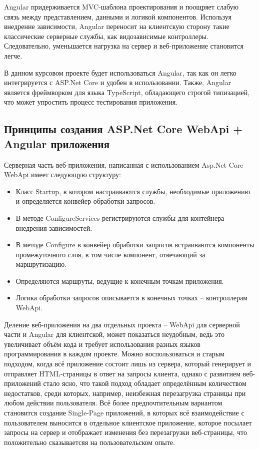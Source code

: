 Angular придерживается MVC-шаблона проектирования и поощряет слабую связь между представлением, данными и логикой компонентов. Используя внедрение зависимости, Angular переносит на клиентскую сторону такие классические серверные службы, как видозависимые контроллеры. Следовательно, уменьшается нагрузка на сервер и веб-приложение становится легче.

В данном курсовом проекте будет использоваться Angular, так как он легко интегрируется с ASP.Net Core и удобен в использовании. Также, Angular является фреймворком для языка TypeScript, обладающего строгой типизацией, что может упростить процесс тестирования приложения.

\subsection{Принципы создания ASP.Net Core WebApi + Angular приложения}
Серверная часть веб-приложения, написанная с использованием Asp.Net Core WebApi имеет следующую структуру:
\begin{itemize}
	\item Класс Startup, в котором настраиваются службы, необходимые приложению и определяется конвейер обработки запросов.
	\item В методе ConfigureServices регистрируются службы для контейнера внедрения зависимостей.
	\item В методе Configure в конвейер обработки запросов встраиваются компоненты промежуточного слоя, в том числе компонент, отвечающий за маршрутизацию.
	\item Определяются маршруты, ведущие к конечным точкам приложения.
	\item Логика обработки запросов описывается в конечных точках -- контроллерам WebApi.
\end{itemize}

Деление веб-приложения на два отдельных проекта -- WebApi для серверной части и Angular для клиентской, может показаться неудобным, ведь это увеличивает объём кода и требует использования разных языков программирования в каждом проекте. Можно воспользоваться и старым подходом, когда всё приложение состоит лишь из сервера, который генерирует и отправляет HTML-страницы в ответ на запросы клиента, однако с развитием веб-приложений стало ясно, что такой подход обладает определённым количеством недостатков, среди которых, например, неизбежная перезагрузка страницы при любом действии пользователя. Всё более предпочтительным вариантом становится создание Single-Page приложений, в которых всё взаимодействие с пользователем выносится в отдельное клиентское приложение, которое посылает запросы на сервер и отображает изменения без перезагрузки веб-страницы, что положительно сказываетсяя на пользовательском опыте.

